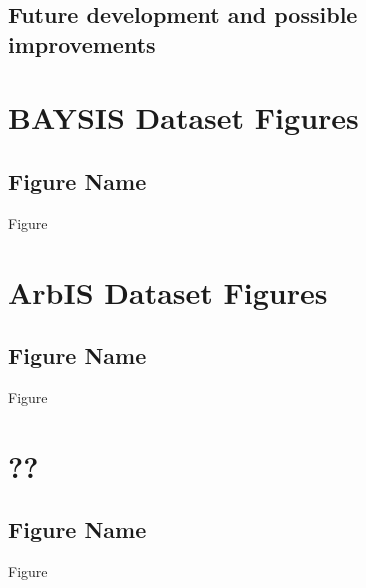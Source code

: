 \documentclass[a4paper,12pt]{report}
\begin{document}
\section{Future development and possible improvements} 



{}

\listoffigures

\listoftables

\printglossary[title=List of Acronyms, type=\acronymtype]

\printglossary[title=List of Terms]

\begin{appendices}
\chapter{BAYSIS Dataset Figures}
\section{Figure Name}
Figure
\chapter{ArbIS Dataset Figures}
\section{Figure Name}
Figure
\chapter{??}
\section{Figure Name}
Figure
\end{appendices}

\pagebreak
{}
\end{document}
